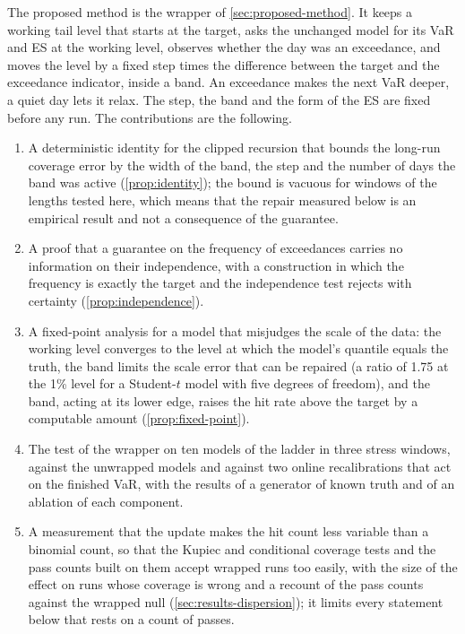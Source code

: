 The proposed method is the wrapper of \cref{sec:proposed-method}. It keeps a working tail level that starts at the target, asks the unchanged model for its VaR and ES at the working level, observes whether the day was an exceedance, and moves the level by a fixed step times the difference between the target and the exceedance indicator, inside a band. An exceedance makes the next VaR deeper, a quiet day lets it relax. The step, the band and the form of the ES are fixed before any run. The contributions are the following.
\begin{enumerate}
\item A deterministic identity for the clipped recursion that bounds the long-run coverage error by the width of the band, the step and the number of days the band was active (\cref{prop:identity}); the bound is vacuous for windows of the lengths tested here, which means that the repair measured below is an empirical result and not a consequence of the guarantee.
\item A proof that a guarantee on the frequency of exceedances carries no information on their independence, with a construction in which the frequency is exactly the target and the independence test rejects with certainty (\cref{prop:independence}).
\item A fixed-point analysis for a model that misjudges the scale of the data: the working level converges to the level at which the model's quantile equals the truth, the band limits the scale error that can be repaired (a ratio of 1.75 at the 1\% level for a Student-$t$ model with five degrees of freedom), and the band, acting at its lower edge, raises the hit rate above the target by a computable amount (\cref{prop:fixed-point}).
\item The test of the wrapper on ten models of the ladder in three stress windows, against the unwrapped models and against two online recalibrations that act on the finished VaR, with the results of a generator of known truth and of an ablation of each component.
\item A measurement that the update makes the hit count less variable than a binomial count, so that the Kupiec and conditional coverage tests and the pass counts built on them accept wrapped runs too easily, with the size of the effect on runs whose coverage is wrong and a recount of the pass counts against the wrapped null (\cref{sec:results-dispersion}); it limits every statement below that rests on a count of passes.
\end{enumerate}

